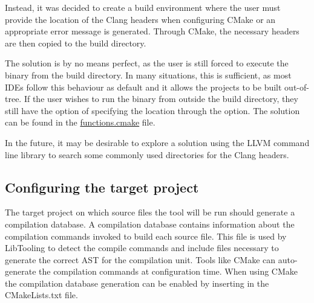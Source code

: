 Instead, it was decided to create a build environment where the user must provide the location of the Clang headers when configuring CMake or an appropriate error message is generated. Through CMake, the necessary headers are then copied to the build directory.

The solution is by no means perfect, as the user is still forced to execute the binary from the build directory. In many situations, this is sufficient, as most IDEs follow this behaviour as default and it allows the projects to be built out-of-tree. If the user wishes to run the binary from outside the build directory, they still have the option of specifying the location through the  option. The solution can be found in the \href{https://github.com/mortenhaahr/RD/blob/main/examples/c_style_array_converter/cmake/functions.cmake}{functions.cmake} file.

In the future, it may be desirable to explore a solution using the LLVM command line library to search some commonly used directories for the Clang headers.

\subsection{Configuring the target project}

The target project on which source files the tool will be run should generate a compilation database. A compilation database contains information about the compilation commands invoked to build each source file. This file is used by LibTooling to detect the compile commands and include files necessary to generate the correct AST for the compilation unit.\cite{JSONCompilationDatabase} Tools like CMake can auto-generate the compilation commands at configuration time. When using CMake the compilation database generation can be enabled by inserting  in the CMakeLists.txt file.